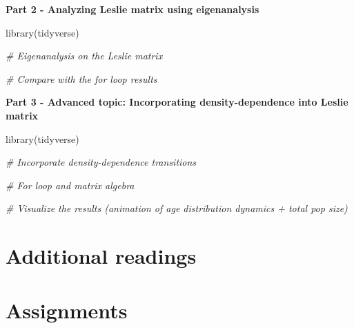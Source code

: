 \documentclass[
]{book}
\newenvironment{Shaded}{\begin{snugshade}}{\end{snugshade}}
\newcommand{\CommentTok}[1]{\textcolor[rgb]{0.56,0.35,0.01}{\textit{#1}}}
\newcommand{\FunctionTok}[1]{\textcolor[rgb]{0.00,0.00,0.00}{#1}}
\newcommand{\NormalTok}[1]{#1}
\begin{document}
\textbf{Part 2 - Analyzing Leslie matrix using eigenanalysis}

\begin{Shaded}
\begin{Highlighting}[]
\FunctionTok{library}\NormalTok{(tidyverse)}

\CommentTok{\# Eigenanalysis on the Leslie matrix}

\CommentTok{\# Compare with the for loop results}
\end{Highlighting}
\end{Shaded}

\textbf{Part 3 - Advanced topic: Incorporating density-dependence into Leslie matrix }

\begin{Shaded}
\begin{Highlighting}[]
\FunctionTok{library}\NormalTok{(tidyverse)}

\CommentTok{\# Incorporate density{-}dependence transitions}

\CommentTok{\# For loop and matrix algebra}

\CommentTok{\# Visualize the results (animation of age distribution dynamics + total pop size)}
\end{Highlighting}
\end{Shaded}

\hypertarget{additional-readings-4}{%
\section*{Additional readings}\label{additional-readings-4}}

\hypertarget{assignments-4}{%
\section*{Assignments}\label{assignments-4}}

  
\end{document}
